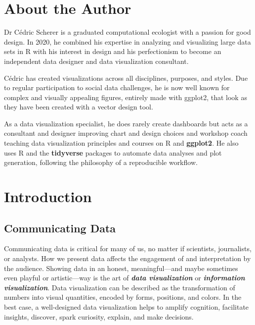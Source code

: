 \documentclass[
]{krantz}
\begin{document}
\hypertarget{about-the-author}{%
\chapter*{About the Author}\label{about-the-author}}


Dr Cédric Scherer is a graduated computational ecologist with a passion for good design. In 2020, he combined his expertise in analyzing and visualizing large data sets in R with his interest in design and his perfectionism to become an independent data designer and data visualization consultant.

Cédric has created visualizations across all disciplines, purposes, and styles. Due to regular participation to social data challenges, he is now well known for complex and visually appealing figures, entirely made with ggplot2, that look as they have been created with a vector design tool.

As a data visualization specialist, he does rarely create dashboards but acts as a consultant and designer improving chart and design choices and workshop coach teaching data visualization principles and courses on R and \textbf{ggplot2}. He also uses R and the \textbf{tidyverse} packages to automate data analyses and plot generation, following the philosophy of a reproducible workflow.

\mainmatter

\hypertarget{introduction}{%
\chapter{Introduction}\label{introduction}}

\hypertarget{communicating-data}{%
\section{Communicating Data}\label{communicating-data}}

Communicating data is critical for many of us, no matter if scientists,
journalists, or analysts. How we present data affects the engagement of
and interpretation by the audience. Showing data in an honest,
meaningful---and maybe sometimes even playful or artistic---way is the
art of \textbf{\emph{data visualization}} or \textbf{\emph{information visualization}}. Data
visualization can be described as the transformation of numbers into
visual quantities, encoded by forms, positions, and colors. In the best
case, a well-designed data visualization helps to amplify cognition,
facilitate insights, discover, spark curiosity, explain, and make
decisions.
\end{document}
